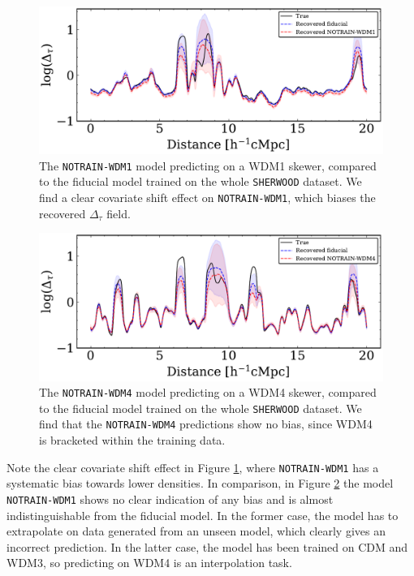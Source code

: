 \begin{figure}
    \centering
    \includegraphics[width=0.9\linewidth]{img/ML/skewer_notrain_wdm1.pdf}
    \caption{The \texttt{NOTRAIN-WDM1} model predicting on a WDM1 skewer, compared to the fiducial model trained on the whole \texttt{SHERWOOD} dataset. We find a clear covariate shift effect on \texttt{NOTRAIN-WDM1}, which biases the recovered $\Delta_\tau$ field. }
    \label{fig: skewer notrain wdm1}
\end{figure}

\begin{figure}
    \centering
    \includegraphics[width=0.9\linewidth]{img/ML/skewer_notrain_wdm4.pdf}
    \caption{The \texttt{NOTRAIN-WDM4} model predicting on a WDM4 skewer, compared to the fiducial model trained on the whole \texttt{SHERWOOD} dataset. We find that the \texttt{NOTRAIN-WDM4} predictions show no bias, since WDM4 is bracketed within the training data.}
    \label{fig: skewer notrain wdm4}
\end{figure}
Note the clear covariate shift effect in Figure \ref{fig: skewer notrain wdm1}, where \texttt{NOTRAIN-WDM1} has a systematic bias towards lower densities. In comparison, in Figure \ref{fig: skewer notrain wdm4} the model \texttt{NOTRAIN-WDM1} shows no clear indication of any bias and is almost indistinguishable from the fiducial model. In the former case, the model has to extrapolate on data generated from an unseen model, which clearly gives an incorrect prediction. In the latter case, the model has been trained on CDM and WDM3, so predicting on WDM4 is an interpolation task.

